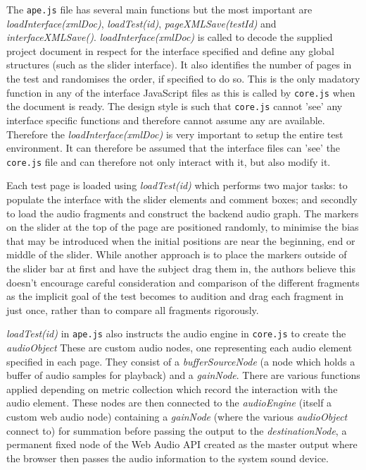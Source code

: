 \documentclass{article}
\begin{document}
The \texttt{ape.js} file has several main functions but the most important are \textit{loadInterface(xmlDoc)}, \textit{loadTest(id)}, \textit{pageXMLSave(testId)} and \textit{interfaceXMLSave()}. \textit{loadInterface(xmlDoc)} is called to decode the supplied project document in respect for the interface specified and define any global structures (such as the slider interface). It also identifies the number of pages in the test and randomises the order, if specified to do so. This is the only madatory function in any of the interface JavaScript files as this is called by \texttt{core.js} when the document is ready. The design style is such that \texttt{core.js} cannot 'see' any interface specific functions and therefore cannot assume any are available. Therefore the \textit{loadInterface(xmlDoc)} is very important to setup the entire test environment. It can therefore be assumed that the interface files can 'see' the \texttt{core.js} file and can therefore not only interact with it, but also modify it.

Each test page is loaded using \textit{loadTest(id)} which performs two major tasks: to populate the interface with the slider elements and comment boxes; and secondly to load the audio fragments and construct the backend audio graph. The markers on the slider at the top of the page are positioned randomly, to minimise the bias that may be introduced when the initial positions are near the beginning, end or middle of the slider. While another approach is to place the markers outside of the slider bar at first and have the subject drag them in, the authors believe this doesn't encourage careful consideration and comparison of the different fragments as the implicit goal of the test becomes to audition and drag each fragment in just once, rather than to compare all fragments rigorously.

\textit{loadTest(id)} in \texttt{ape.js} also instructs the audio engine in \texttt{core.js} to create the \textit{audioObject} These are custom audio nodes, one representing each audio element specified in each page.
They consist of a \textit{bufferSourceNode} (a node which holds a buffer of audio samples for playback) and a \textit{gainNode}. There are various functions applied depending on metric collection which record the interaction with the audio element. These nodes are then connected to the \textit{audioEngine} (itself a custom web audio node) containing a \textit{gainNode} (where the various \textit{audioObject} connect to) for summation before passing the output to the \textit{destinationNode}, a permanent fixed node of the Web Audio API created as the master output where %
the browser then passes the audio information to the system sound device.
\end{document}
